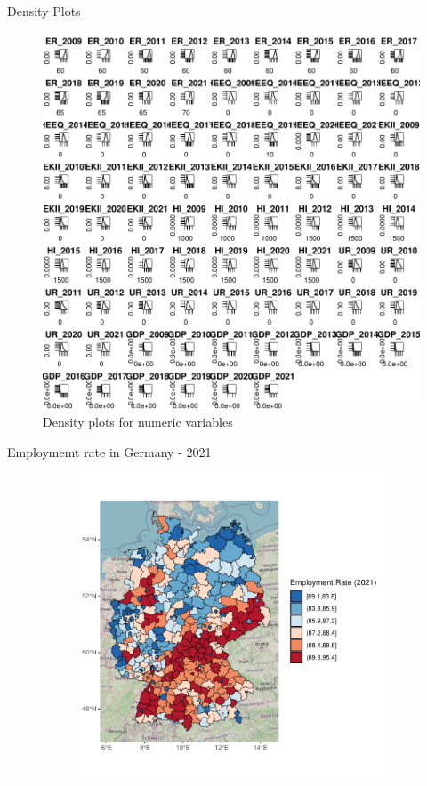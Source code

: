 \documentclass[10pt]{beamer}
\begin{document}
\begin{frame}{Density Plots}
\begin{figure}
\includegraphics{S_E_Ampah_QRE-apply-density-function}
\caption{Density plots for numeric variables}
\end{figure}
\end{frame}


\begin{frame}[fragile]{Employmemt rate in Germany - 2021}
\begin{figure}
\begin{subfigure}[b]{1\textheight}
\includegraphics{S_E_Ampah_QRE-quantile-map-visualization}
\end{subfigure}
\end{figure}
\end{frame}
\end{document}

